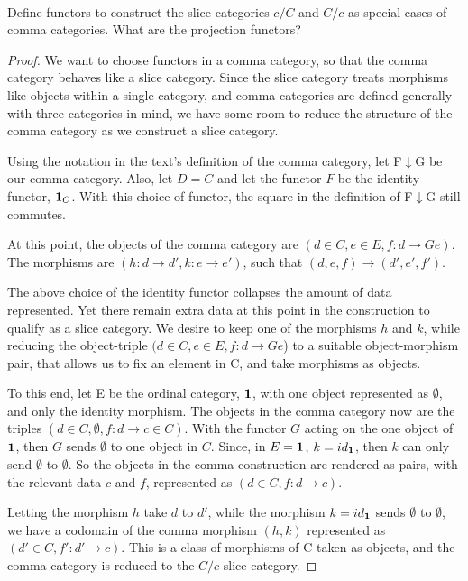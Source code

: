 \documentclass[main.tex]{subfiles}
\begin{document}
\paragraph{}
\begin{exercise}
	Define functors to construct the slice categories $c/C$ and $C/c$ as special
	cases of comma categories. What are the projection functors?
\end{exercise}

\begin{proof}
	We want to choose functors in a comma category, so that the comma category
	behaves like a slice category. Since the slice category treats morphisms
	like objects within a single category, and comma categories are defined
	generally with three categories in mind, we have some room to reduce the
	structure of the comma category as we construct a slice category.

	Using the notation in the text's definition of the comma category, let
	F$\downarrow$G be our comma category. Also, let $D = C$ and let the functor
	$F$ be the identity functor, $\bold 1_C$. With this choice of functor, the
	square in the definition of F$\downarrow$G still commutes.

	At this point, the objects of the comma category are $(d \in C, e\in E, f: d
	\rightarrow Ge)$. The morphisms are $(h: d\rightarrow d', k: e\rightarrow
	e')$, such that $(d,e,f) \rightarrow (d',e',f')$.

	The above choice of the identity functor collapses the amount of data
	represented. Yet there remain extra data at this point in the construction
	to qualify as a slice category. We desire to keep one of the morphisms $h$
	and $k$, while reducing the object-triple $(d \in C, e\in E, f: d
	\rightarrow Ge$) to a suitable object-morphism pair, that allows us to fix
	an element in C, and take morphisms as objects.

	To this end, let E be the ordinal category, $\bold 1$, with one object
	represented as $\emptyset$, and only the identity morphism. The objects in
	the comma category now are the triples $(d \in C, \emptyset, f: d
	\rightarrow c \in C)$. With the functor $G$ acting on the one object of
	$\bold 1$, then $G$ sends $\emptyset$ to one object in $C$. Since, in $E =
	\bold 1$, $k = id_{\bold 1}$, then $k$ can only send $\emptyset$ to
	$\emptyset$. So the objects in the comma construction are rendered as pairs,
	with the relevant data $c$ and $f$, represented as $(d \in C, f: d
	\rightarrow c)$.

	Letting the morphism $h$ take $d$ to $d'$, while the morphism $k = id_{\bold
	1}$ sends $\emptyset$ to $\emptyset$, we have a codomain of the comma
	morphism $(h,k)$ represented as $(d' \in C, f': d' \rightarrow c)$. This is
	a class of morphisms of C taken as objects, and the comma category is
	reduced to the $C/c$ slice category.
\end{proof}
\end{document}
